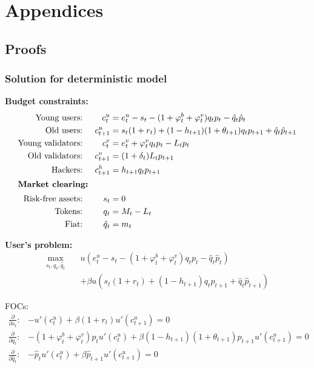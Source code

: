 \documentclass[./main.tex]{subfiles}
\begin{document}
\appendix
\section*{Appendices}
\renewcommand{\thesubsection}{\Alph{subsection}}

\subsection{Proofs}

\subsubsection{Solution for deterministic model}

\noindent \textbf{Budget constraints:}
\begin{align}
    \text{Young users: } && c_t^u &= e_t^u - s_t - (1+ \varphi_t^b+\varphi_t^v) q_t p_t - \hat{q}_t \hat{p}_t\\
    \text{Old users: } && c_{t+1}^u &=  s_t (1+r_t) + (1-h_{t+1})(1+\theta_{t+1}) q_t p_{t+1} + \hat{q}_t \hat{p}_{t+1} \\
    \text{Young validators: } && c_t^v &= e_t^v + \varphi_t^v q_t p_t - L_t p_t \\
    \text{Old validators: } && c_{t+1}^v &= (1+\delta_t) L_t p_{t+1} \\
    \text{Hackers: } && c_{t+1}^h &= h_{t+1} q_t p_{t+1}\\
\intertext{\textbf{Market clearing:}}
    \text{Risk-free assets: } && s_t &= 0\\
    \text{Tokens: } && q_t &= M_t - L_t\\
    \text{Fiat: } && \hat{q}_t &= m_t
\end{align}

\noindent \textbf{User's problem:}
\begin{equation}
    \begin{split}    
        \max_{s_t, q_t, \hat{q}_t}\quad & u\left(e_t^u - s_t - (1+ \varphi_t^b+\varphi_t^v) q_t p_t - \hat{q}_t \hat{p}_t\right)\\
        &+ \beta u\left(s_t (1+r_t) + (1-h_{t+1}) q_t p_{t+1} + \hat{q}_t \hat{p}_{t+1}\right)
    \end{split}
\end{equation}

FOCs:
\begin{align}
    \frac{\partial}{\partial s_t}: & -u'(c_t^u) + \beta(1+r_t)u'(c_{t+1}^u) = 0\\
    \frac{\partial}{\partial q_t}: & -(1+\varphi_t^b+\varphi_t^v) p_t u'(c_t^u) + \beta(1-h_{t+1})(1+\theta_{t+1})p_{t+1}u'(c_{t+1}^u) = 0 \\
    \frac{\partial}{\partial \hat{q}_t}: & -\hat{p}_t u'(c_t^u) + \beta \hat{p}_{t+1}u'(c_{t+1}^u) = 0
\end{align}
\end{document}
